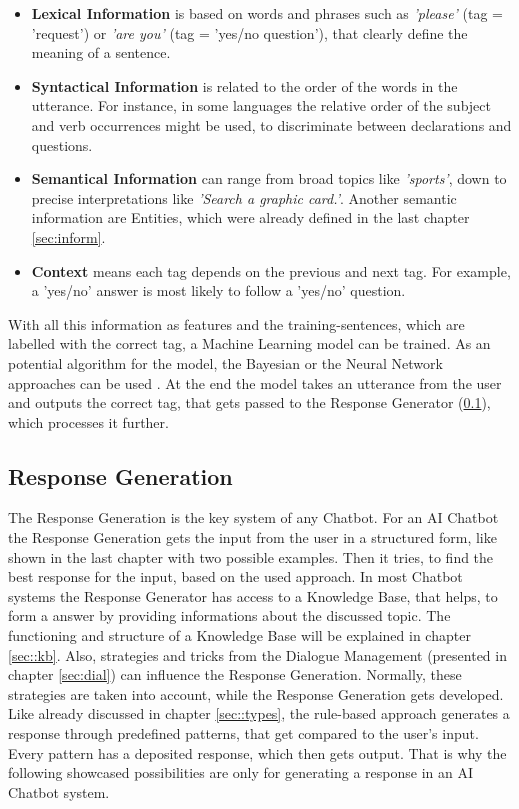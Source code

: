 \documentclass[10pt,final,journal,a4paper,oneside,twocolumn]{IEEEtran}
\begin{document}
\begin{itemize}
	\item \textbf{Lexical Information} is based on words and phrases such as \textit{'please'} (tag = 'request') or \textit{'are you'} (tag = 'yes/no question'), that clearly define the meaning of a sentence.
	\item \textbf{Syntactical Information} is related to the order of the words in the utterance. For instance, in some languages the relative order of the subject and verb occurrences might be used, to discriminate between declarations and questions.
	\item \textbf{Semantical Information} can range from broad topics like \textit{'sports'}, down to precise interpretations like \textit{'Search a graphic card.'}. Another semantic information are Entities, which were already defined in the last chapter \ref{sec:inform}.
	\item \textbf{Context} means each tag depends on the previous and next tag. For example, a 'yes/no' answer is most likely to follow a 'yes/no' question.
\end{itemize} 
With all this information as features and the training-sentences, which are labelled with the correct tag, a Machine Learning model can be trained. As an potential algorithm for the model, the Bayesian or the Neural Network approaches can be used \cite[p. 8-19]{b12}. At the end the model takes an utterance from the user and outputs the correct tag, that gets passed to the Response Generator (\ref{sec::rg}), which processes it further. 

\subsection{Response Generation}\label{sec::rg}
The Response Generation is the key system of any Chatbot. For an AI Chatbot the Response Generation gets the input from the user in a structured form, like shown in the last chapter with two possible examples. Then it tries, to find the best response for the input, based on the used approach. In most Chatbot systems the Response Generator has access to a Knowledge Base, that helps, to form a answer by providing informations about the discussed topic. The functioning and structure of a Knowledge Base will be explained in chapter \ref{sec::kb}. Also, strategies and tricks from the Dialogue Management (presented in chapter \ref{sec:dial}) can influence the Response Generation. Normally, these strategies are taken into account, while the Response Generation gets developed.\\
Like already discussed in chapter \ref{sec::types}, the rule-based approach generates a response through predefined patterns, that get compared to the user's input. Every pattern has a deposited response, which then gets output. That is why the following showcased possibilities are only for generating a response in an AI Chatbot system.
\\
\end{document}
